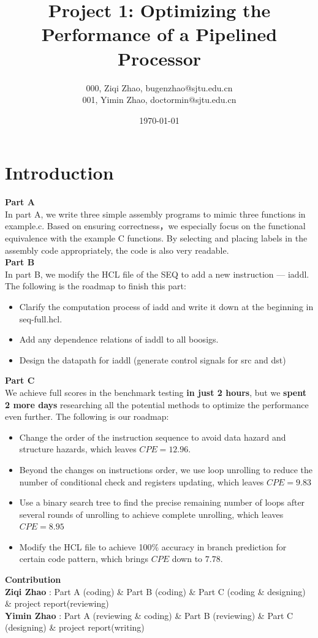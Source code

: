 \documentclass{article}
\title{\textbf{Project 1: Optimizing the Performance of a Pipelined Processor}} %
\author{000, Ziqi Zhao, bugenzhao@sjtu.edu.cn \\
        001, Yimin Zhao, doctormin@sjtu.edu.cn \\ } %
\date{\today} %
\begin{document}
\maketitle %

\section{Introduction}
\textbf{Part A}
\\
In part A, we write three simple assembly programs to mimic three functions in example.c. 
Based on ensuring correctness，we especially focus on the functional equivalence with the example C functions. 
By selecting and placing labels in the assembly code appropriately, the code is also very readable.\\
\textbf{Part B}
\\
In part B, we modify the HCL file of the SEQ to add a new instruction --- iaddl. 
The following is the roadmap to finish this part:
\begin{itemize}
        \item Clarify the computation process of iadd and write it down at the beginning in seq-full.hcl.
        \item Add any dependence relations of iaddl to all boosigs.
        \item Design the datapath for iaddl (generate control signals for src and dst)
\end{itemize}
\textbf{Part C}
\\
We achieve full scores in the benchmark testing \textbf{in just 2 hours}, 
but we \textbf{spent 2 more days} researching all the potential methods to optimize the performance even further. 
The following is our roadmap:
\begin{itemize}
        \item Change the order of the instruction sequence to avoid data hazard and structure hazards, which leaves $CPE = 12.96$.
        \item Beyond the changes on instructions order, we use loop unrolling to reduce the number of conditional check and registers updating, which leaves $CPE = 9.83$
        \item Use a binary search tree to find the precise remaining number of loops after several rounds of unrolling to achieve complete unrolling, which leaves $CPE = 8.95$
        \item Modify the HCL file to achieve 100\% accuracy in branch prediction for certain code pattern, which brings $CPE$ down to $7.78$.
\end{itemize}
\textbf{Contribution}
\\
\textbf{Ziqi Zhao} : Part A (coding) \& Part B (coding) \& Part C (coding \& designing) \& project report(reviewing) \\
\textbf{Yimin Zhao} : Part A (reviewing \& coding) \& Part B (reviewing) \& Part C (designing) \& project report(writing)
\end{document}
